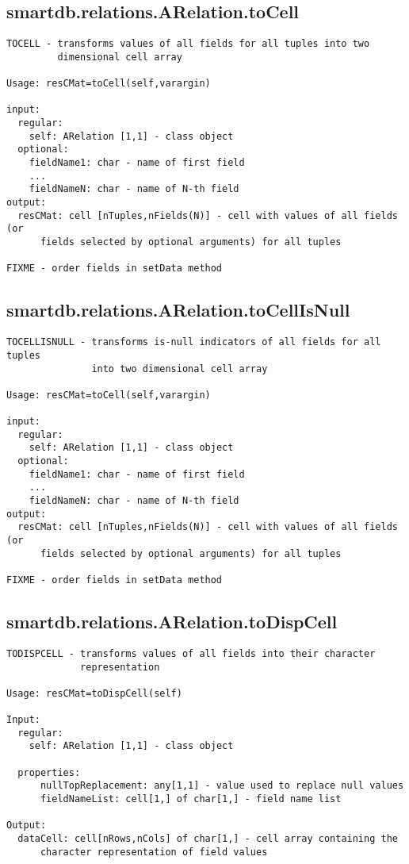 \subsection{\texorpdfstring{smartdb.relations.ARelation.toCell}{toCell}}\label{method:smartdb.relations.ARelation.toCell}
\begin{verbatim}
TOCELL - transforms values of all fields for all tuples into two
         dimensional cell array

Usage: resCMat=toCell(self,varargin)

input:
  regular:
    self: ARelation [1,1] - class object
  optional:
    fieldName1: char - name of first field
    ...
    fieldNameN: char - name of N-th field
output:
  resCMat: cell [nTuples,nFields(N)] - cell with values of all fields (or
      fields selected by optional arguments) for all tuples

FIXME - order fields in setData method
\end{verbatim}
\subsection{\texorpdfstring{smartdb.relations.ARelation.toCellIsNull}{toCellIsNull}}\label{method:smartdb.relations.ARelation.toCellIsNull}
\begin{verbatim}
TOCELLISNULL - transforms is-null indicators of all fields for all tuples
               into two dimensional cell array

Usage: resCMat=toCell(self,varargin)

input:
  regular:
    self: ARelation [1,1] - class object
  optional:
    fieldName1: char - name of first field
    ...
    fieldNameN: char - name of N-th field
output:
  resCMat: cell [nTuples,nFields(N)] - cell with values of all fields (or
      fields selected by optional arguments) for all tuples

FIXME - order fields in setData method
\end{verbatim}
\subsection{\texorpdfstring{smartdb.relations.ARelation.toDispCell}{toDispCell}}\label{method:smartdb.relations.ARelation.toDispCell}
\begin{verbatim}
TODISPCELL - transforms values of all fields into their character
             representation

Usage: resCMat=toDispCell(self)

Input:
  regular:
    self: ARelation [1,1] - class object

  properties:
      nullTopReplacement: any[1,1] - value used to replace null values
      fieldNameList: cell[1,] of char[1,] - field name list

Output:
  dataCell: cell[nRows,nCols] of char[1,] - cell array containing the
      character representation of field values
\end{verbatim}
